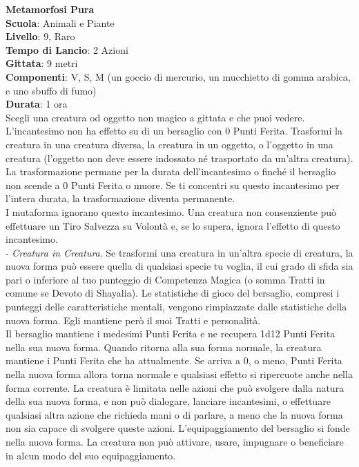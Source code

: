 \begin{multicols}{2}
\medskip\textbf{Metamorfosi Pura}\\
\textbf{Scuola}: Animali e Piante\\
\textbf{Livello}: 9, Raro\\
\textbf{Tempo di Lancio}: 2 Azioni\\
\textbf{Gittata}: 9 metri\\
\textbf{Componenti}: V, S, M (un goccio di mercurio, un mucchietto di gomma arabica, e uno sbuffo di fumo) \\
\textbf{Durata}: 1 ora \\
Scegli una creatura od oggetto non magico a gittata e che puoi vedere. L'incantesimo non ha effetto su di un bersaglio con 0 Punti Ferita. Trasformi la creatura in una creatura diversa, la creatura in un oggetto, o l'oggetto in una creatura (l'oggetto non deve essere indossato né trasportato da un'altra creatura). La trasformazione permane per la durata dell'incantesimo o finché il bersaglio non scende a 0 Punti Ferita o muore. Se ti concentri su questo incantesimo per l'intera durata, la trasformazione diventa permanente.\\
I mutaforma ignorano questo incantesimo. Una creatura non consenziente può effettuare un Tiro Salvezza su Volontà e, se lo supera, ignora l'effetto di questo incantesimo.\\

- \textit{Creatura in Creatura}. Se trasformi una creatura in un'altra specie di creatura, la nuova forma può essere quella di qualsiasi specie tu voglia, il cui grado di sfida sia pari o inferiore al tuo punteggio di Competenza Magica (o somma Tratti in comune se Devoto di Shayalia). Le statistiche di gioco del bersaglio, compresi i punteggi delle caratteristiche mentali, vengono rimpiazzate dalle statistiche della nuova forma. Egli mantiene però il suoi Tratti e personalità. \\
Il bersaglio mantiene i medesimi Punti Ferita e ne recupera 1d12 Punti Ferita nella sua nuova forma. Quando ritorna alla sua forma normale, la creatura mantiene i Punti Ferita che ha attualmente. Se arriva a 0, o meno, Punti Ferita nella nuova forma allora torna normale e qualsiasi effetto si ripercuote anche nella forma corrente. La creatura è limitata nelle azioni che può svolgere dalla natura della sua nuova forma, e non può dialogare, lanciare incantesimi, o effettuare qualsiasi altra azione che richieda mani o di parlare, a meno che la nuova forma non sia capace di svolgere queste azioni. L'equipaggiamento del bersaglio si fonde nella nuova forma. La creatura non può attivare, usare, impugnare o beneficiare in alcun modo del suo equipaggiamento. \\


\end{multicols}
